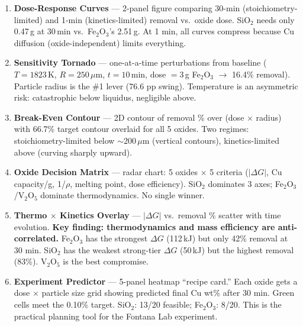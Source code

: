\documentclass[11pt]{article}
\begin{document}
\begin{enumerate}[leftmargin=*]
    \item \textbf{Dose-Response Curves} --- 2-panel figure comparing 30-min (stoichiometry-limited) and 1-min (kinetics-limited) removal vs.\ oxide dose. SiO$_2$ needs only 0.47\,g at 30\,min vs.\ Fe$_2$O$_3$'s 2.51\,g. At 1 min, all curves compress because Cu diffusion (oxide-independent) limits everything.

    \item \textbf{Sensitivity Tornado} --- one-at-a-time perturbations from baseline ($T=1823$\,K, $R=250$\,$\mu$m, $t=10$\,min, dose $=3$\,g Fe$_2$O$_3$ $\to$ 16.4\% removal). Particle radius is the \#1 lever (76.6 pp swing). Temperature is an asymmetric risk: catastrophic below liquidus, negligible above.

    \item \textbf{Break-Even Contour} --- 2D contour of removal \% over (dose $\times$ radius) with 66.7\% target contour overlaid for all 5 oxides. Two regimes: stoichiometry-limited below $\sim$200\,$\mu$m (vertical contours), kinetics-limited above (curving sharply upward).

    \item \textbf{Oxide Decision Matrix} --- radar chart: 5 oxides $\times$ 5 criteria ($|\Delta G|$, Cu capacity/g, 1/$\rho$, melting point, dose efficiency). SiO$_2$ dominates 3 axes; Fe$_2$O$_3$/V$_2$O$_5$ dominate thermodynamics. No single winner.

    \item \textbf{Thermo $\times$ Kinetics Overlay} --- $|\Delta G|$ vs.\ removal \% scatter with time evolution. \textbf{Key finding: thermodynamics and mass efficiency are anti-correlated.} Fe$_2$O$_3$ has the strongest $\Delta G$ (112\,kJ) but only 42\% removal at 30 min. SiO$_2$ has the weakest strong-tier $\Delta G$ (50\,kJ) but the highest removal (83\%). V$_2$O$_5$ is the best compromise.

    \item \textbf{Experiment Predictor} --- 5-panel heatmap ``recipe card.'' Each oxide gets a dose $\times$ particle size grid showing predicted final Cu wt\% after 30 min. Green cells meet the 0.10\% target. SiO$_2$: 13/20 feasible; Fe$_2$O$_3$: 8/20. This is the practical planning tool for the Fontana Lab experiment.
\end{enumerate}
\end{document}
